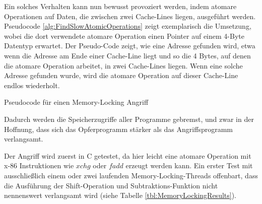 Ein solches Verhalten kann nun bewusst provoziert werden, indem atomare Operationen auf Daten, die zwischen zwei Cache-Lines liegen, ausgeführt werden. Pseudocode \ref{alg:FindSlowAtomicOperations} zeigt exemplarisch die Umsetzung, wobei die dort verwendete atomare Operation einen Pointer auf einem 4-Byte Datentyp erwartet. 
Der Pseudo-Code zeigt, wie eine Adresse gefunden wird, etwa wenn die Adresse am Ende einer Cache-Line liegt und so die 4 Bytes, auf denen die atomare Operation arbeitet, in zwei Cache-Lines liegen. 
Wenn eine solche Adresse gefunden wurde, wird die atomare Operation auf dieser Cache-Line endlos wiederholt.

\begin{algorithm}[h]
\DontPrintSemicolon
\caption{Pseudocode für einen Memory-Locking Angriff}
\label{alg:FindSlowAtomicOperations}

\end{algorithm}

Dadurch werden die Speicherzugriffe aller Programme gebremst, und zwar in der Hoffnung, dass sich das Opferprogramm stärker als das Angriffsprogramm verlangsamt.

Der Angriff wird zuerst in C getestet, da hier leicht eine atomare Operation mit x-86 Instruktionen wie $xchg$ oder $fadd$ erzeugt werden kann.
Ein erster Test mit ausschließlich einem oder zwei laufenden Memory-Locking-Threads offenbart, dass die Ausführung der Shift-Operation und Subtraktions-Funktion nicht nennenswert verlangsamt wird (siehe Tabelle \ref{tbl:MemoryLockingResults}).

